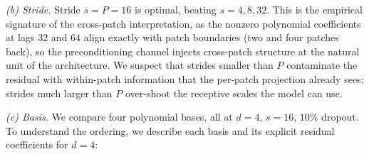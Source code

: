 \documentclass[11pt]{article}
\theoremstyle{plain}
\theoremstyle{definition}
\theoremstyle{remark}
\newcommand{\Baseline}{\textsf{Baseline}}
\begin{document}

\emph{(b) Stride.} Stride $s = P = 16$ is optimal, beating $s = 4, 8, 32$. This is the empirical signature of the cross-patch interpretation, as the nonzero polynomial coefficients at lags $32$ and $64$ align exactly with patch boundaries (two and four patches back), so the preconditioning channel injects cross-patch structure at the natural unit of the architecture. We suspect that strides smaller than $P$ contaminate the residual with within-patch information that the per-patch projection already sees; strides much larger than $P$ over-shoot the receptive scales the model can use.

\emph{(c) Basis.} We compare four polynomial bases, all at $d = 4$, $s = 16$, $10\%$ dropout. To understand the ordering, we describe each basis and its explicit residual coefficients for $d = 4$:
\end{document}
